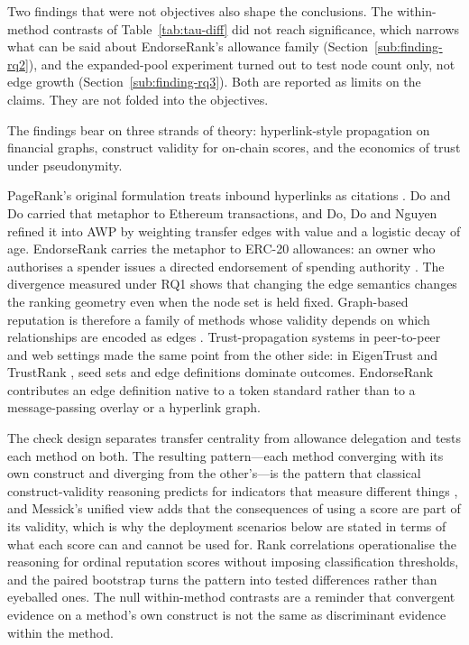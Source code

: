 Two findings that were not objectives also shape the conclusions. The within-method contrasts of Table~\ref{tab:tau-diff} did not reach significance, which narrows what can be said about EndorseRank's allowance family (Section~\ref{sub:finding-rq2}), and the expanded-pool experiment turned out to test node count only, not edge growth (Section~\ref{sub:finding-rq3}). Both are reported as limits on the claims. They are not folded into the objectives.


The findings bear on three strands of theory: hyperlink-style propagation on financial graphs, construct validity for on-chain scores, and the economics of trust under pseudonymity.


PageRank's original formulation treats inbound hyperlinks as citations . Do and Do carried that metaphor to Ethereum transactions, and Do, Do and Nguyen refined it into AWP by weighting transfer edges with value and a logistic decay of age. EndorseRank carries the metaphor to ERC-20 allowances: an owner who authorises a spender issues a directed endorsement of spending authority . The divergence measured under RQ1 shows that changing the edge semantics changes the ranking geometry even when the node set is held fixed. Graph-based reputation is therefore a family of methods whose validity depends on which relationships are encoded as edges . Trust-propagation systems in peer-to-peer and web settings made the same point from the other side: in EigenTrust  and TrustRank , seed sets and edge definitions dominate outcomes. EndorseRank contributes an edge definition native to a token standard rather than to a message-passing overlay or a hyperlink graph.


The check design separates transfer centrality from allowance delegation and tests each method on both. The resulting pattern---each method converging with its own construct and diverging from the other's---is the pattern that classical construct-validity reasoning predicts for indicators that measure different things , and Messick's  unified view adds that the consequences of using a score are part of its validity, which is why the deployment scenarios below are stated in terms of what each score can and cannot be used for. Rank correlations  operationalise the reasoning for ordinal reputation scores without imposing classification thresholds, and the paired bootstrap  turns the pattern into tested differences rather than eyeballed ones. The null within-method contrasts are a reminder that convergent evidence on a method's own construct is not the same as discriminant evidence within the method.

